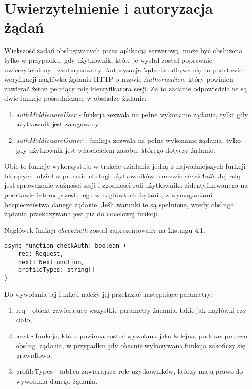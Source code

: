 \documentclass[a4paper,12pt,twoside,openany]{report}
\begin{document}
\section{Uwierzytelnienie i autoryzacja żądań}
Większość żądań obsługiwanych przez aplikacją serwerową, może być obsłużona tylko w przypadku, gdy użytkownik, które je wysłał został poprawnie uwierzytelniony i zautoryzowany. 
Autoryzacja żądania odbywa się na podstawie weryfikacji nagłówka żądania HTTP o nazwie \textit{Authorization}, który powinien zawierać żeton pełniący rolę identyfikatora sesji. Za to zadanie odpowiedzialne są dwie funkcje pośredniczące w obsłudze żądania: 
\begin{enumerate}
	
	\item \textit{authMiddlewareUser} - funkcja zezwala na pełne wykonanie żądania, tylko gdy użytkownik jest zalogowany.
	
	\item \textit{authMiddlewareOwner} - funkcja zezwala na pełne wykonanie żądania, tylko gdy użytkownik jest właścicielem zasobu, którego dotyczy żądanie.
	
\end{enumerate}

Obie te funkcje wykorzystują w trakcie działania jedną z najważniejszych funkcji biorących udział w procesie obsługi użytkowników o nazwie \textit{checkAuth}. Jej rolą jest sprawdzenie ważności sesji i zgodności roli użytkownika zidentyfikowanego na podstawie żetonu przesłanego w nagłówkach żądania, z wymaganiami bezpieczeństwa danego żądanie. Jeśli warunki te są spełnione, wtedy obsługa żądania przekazywana jest już do docelowej funkcji. 

Nagłówek funkcji \textit{checkAuth} został zaprezentowany na Listingu 4.1.

\begin{lstlisting}[caption=Sygnatura funkcji checkAuth,label=code1,captionpos=b]
async function checkAuth: boolean (
	req: Request,
	next: NextFunction,                        
	profileTypes: string[]
)
\end{lstlisting}



Do wywołania tej funkcji należy jej przekazać następujące parametry:
\begin{enumerate}
	
	\item req - obiekt zawierający wszystkie parametry żądania, takie jak nagłówki czy ciało,
	
	\item next - funkcja, która powinna zostać wywołana jako kolejna, podczas procesu obsługi żądania, w przypadku gdy obecnie wykonywana funkcja zakończy się prawidłowo,
	
	\item profileTypes - tablica zawierająca role użytkowników, którzy mają prawo do wywołania danego żądania.
\end{enumerate}
\end{document}
